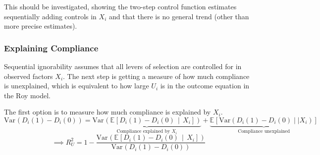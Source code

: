 \documentclass[a4paper, 12pt]{article}                                     %
\renewcommand{\vec}[1]{\boldsymbol{\mathit{#1}}}                           %
\newcommand{\E}[2][]{\mathbb{E}_{#1} \left[ #2 \right]}                    %
\newcommand{\Egiven}[3][]{\mathbb{E}_{#1} \left[ #2 \, \middle\vert \, #3 \right]} %
\newcommand{\Var}[2][]{\text{Var}_{#1} \left( #2 \right)}                  %
\begin{document}
This should be investigated, showing the two-step control function estimates sequentially adding controls in $\vec X_i$ and that there is no general trend (other than more precise estimates).

\subsubsection{Explaining Compliance}
Sequential ignorability assumes that all levers of selection are controlled for in observed factors $\vec X_i$.
The next step is getting a measure of how much compliance is unexplained, which is equivalent to how large $U_i$ is in the outcome equation in the Roy model.

The first option is to measure how much compliance is explained by $\vec X_i$.
\[ \Var{D_i(1) - D_i(0)} =
    \underbrace{
        \Var{\Egiven{D_i(1) - D_i(0)}{X_i}}}_{
            \text{Compliance explained by }\vec X_i}
    + \underbrace{
        \E{\text{Var} \left( D_i(1) - D_i(0) \mid| \vec X_i \right)}}_{
            \text{Compliance unexplained}} \]
\[ \implies R^2_U =
    1 - \frac{
        \Var{\Egiven{D_i(1) - D_i(0)}{X_i}}}{
            \Var{D_i(1) - D_i(0)}} \]
\end{document}
